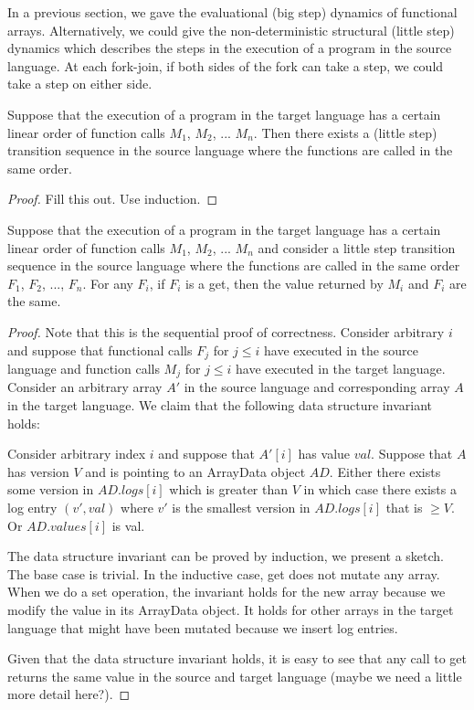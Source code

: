 \documentclass[preprint]{sigplanconf}
\begin{document}
In a previous section, we gave the evaluational (big step) dynamics of functional arrays. Alternatively, we could give the non-deterministic structural (little step) dynamics which describes the steps in the execution of a program in the source language. At each fork-join, if both sides of the fork can take a step, we could take a step on either side.

\begin{theorem}
Suppose that the execution of a program in the target language has a certain linear order of function calls $M_1$, $M_2$, ... $M_n$. Then there exists a (little step) transition sequence in the source language where the functions are called in the same order.
\end{theorem}

\begin{proof}
Fill this out. Use induction.
\end{proof}

\begin{theorem}
Suppose that the execution of a program in the target language has a certain linear order of function calls $M_1$, $M_2$, ... $M_n$ and consider a little step transition sequence in the source language where the functions are called in the same order $F_1$, $F_2$, ..., $F_n$. For any $F_i$, if $F_i$ is a get, then the value returned by $M_i$ and $F_i$ are the same.
\end{theorem}

\begin{proof}
Note that this is the sequential proof of correctness. Consider arbitrary $i$ and suppose that functional calls $F_j$ for $j \leq i$ have executed in the source language and function calls $M_j$ for $j \leq i$ have executed in the target language. Consider an arbitrary array $A'$ in the source language and corresponding array $A$ in the target language. We claim that the following data structure invariant holds:

Consider arbitrary index $i$ and suppose that $A'[i]$ has value $val$. Suppose that $A$ has version $V$ and is pointing to an ArrayData object $AD$. Either there exists some version in $AD.logs[i]$ which is greater than $V$ in which case there exists a log entry $(v', val)$ where $v'$ is the smallest version in $AD.logs[i]$ that is $\geq V$. Or $AD.values[i]$ is val.

The data structure invariant can be proved by induction, we present a sketch. The base case is trivial. In the inductive case, get does not mutate any array. When we do a set operation, the invariant holds for the new array because we modify the value in its ArrayData object. It holds for other arrays in the target language that might have been mutated because we insert log entries.

Given that the data structure invariant holds, it is easy to see that any call to get returns the same value in the source and target language (maybe we need a little more detail here?).
\end{proof}
\end{document}
